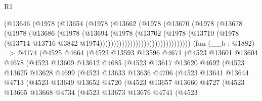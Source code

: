 \begin{lexlean}{R1}
\begin{coremodule}
                                (@13646
                                  (@1978
                                    (@13654
                                      (@1978
                                        (@13662
                                          (@1978
                                            (@13670
                                              (@1978
                                                (@13678
                                                  (@1978
                                                    (@13686
                                                      (@1978
                                                        (@13694
                                                          (@1978
                                                            (@13702
                                                              (@1978
                                                                (@13710
                                                                  (@1978
                                                                    (@13714
                                                                      @13716
                                                                      @3842
                                                                      @1974)))))))))))))))))))))))))))))))))
    (fun (__b : @1882) =>
    @4174
      (@4525
        @4664
        (@4523
          @13593
          @13596
          @4671
          (@4523
            @13601
            @13604
            @4678
            (@4523
              @13609
              @13612
              @4685
              (@4523
                @13617
                @13620
                @4692
                (@4523
                  @13625
                  @13628
                  @4699
                  (@4523
                    @13633
                    @13636
                    @4706
                    (@4523
                      @13641
                      @13644
                      @4713
                      (@4523
                        @13649
                        @13652
                        @4720
                        (@4523
                          @13657
                          @13660
                          @4727
                          (@4523
                            @13665
                            @13668
                            @4734
                            (@4523
                              @13673
                              @13676
                              @4741
                              (@4523

\end{coremodule}
\end{lexlean}
